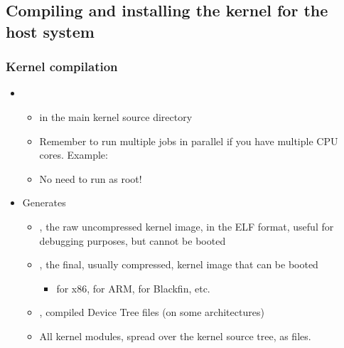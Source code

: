\subsection[Installation on the host]{Compiling and installing the
  kernel for the host system}

\begin{frame}
  \frametitle{Kernel compilation}
  \begin{itemize}
  \item {}
    \begin{itemize}
    \item in the main kernel source directory
    \item Remember to run multiple jobs in parallel
          if you have multiple CPU cores. Example: 
    \item No need to run as root!
    \end{itemize}
  \item Generates
    \begin{itemize}
    \item {}, the raw uncompressed kernel image, in the
      ELF format, useful for debugging purposes, but cannot be booted
    \item {}, the final, usually
      compressed, kernel image that can be booted
      \begin{itemize}
      \item {} for x86,  for ARM,
         for Blackfin, etc.
      \end{itemize}
    \item {}, compiled Device Tree
      files (on some architectures)
    \item All kernel modules, spread over the kernel source tree, as
       files.
    \end{itemize}
  \end{itemize}
\end{frame}

